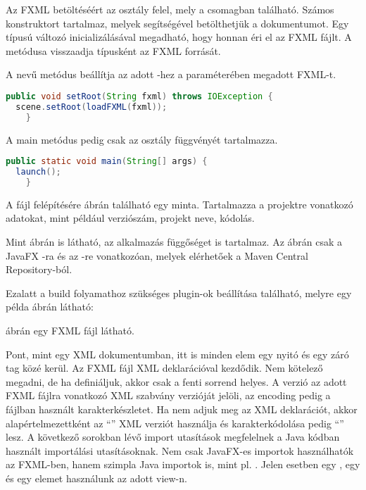 Az FXML betöltéséért az  osztály felel, mely a  csomagban található.
Számos konstruktort tartalmaz, melyek segítségével betölthetjük a dokumentumot.
Egy  típusú változó inicializálásával megadható, hogy honnan éri el az FXML fájlt.
A  metódusa visszaadja  típusként az FXML forrását.

A  nevű metódus beállítja az adott -hez a paraméterében megadott FXML-t.

\begin{lstlisting}[language=Java]
public void setRoot(String fxml) throws IOException {
  scene.setRoot(loadFXML(fxml));
    }
\end{lstlisting}
 

A main metódus pedig csak az  osztály  függvényét tartalmazza. 

\begin{lstlisting}[language=Java]
public static void main(String[] args) {
  launch();
    }
\end{lstlisting}

A  fájl felépítésére  ábrán található egy minta.
Tartalmazza a projektre vonatkozó adatokat, mint például verziószám, projekt neve, kódolás. 
 

 
Mint  ábrán is látható, az alkalmazás függőséget is tartalmaz.
Az ábrán csak a JavaFX -ra és az -re vonatkozóan, melyek elérhetőek a Maven Central Repository-ból. 
  

Ezalatt a build folyamathoz szükséges plugin-ok beállítása található, melyre egy példa  ábrán látható: 




 ábrán egy FXML fájl látható.

 
Pont, mint egy XML dokumentumban, itt is minden elem egy nyitó és egy záró tag közé kerül.
Az FXML fájl XML deklarációval kezdődik.
Nem kötelező megadni, de ha definiáljuk, akkor csak a fenti sorrend helyes.
A verzió az adott FXML fájlra vonatkozó XML szabvány verzióját jelöli, az encoding pedig a fájlban használt karakterkészletet.
Ha nem adjuk meg az XML deklarációt, akkor alapértelmezettként az “” XML verziót használja és karakterkódolása pedig “” lesz.
A következő sorokban lévő import utasítások megfelelnek a Java kódban használt importálási utasításoknak.
Nem csak JavaFX-es importok használhatók az FXML-ben, hanem szimpla Java importok is, mint pl. .
Jelen esetben egy , egy  és egy  elemet használunk az adott view-n. 
 
